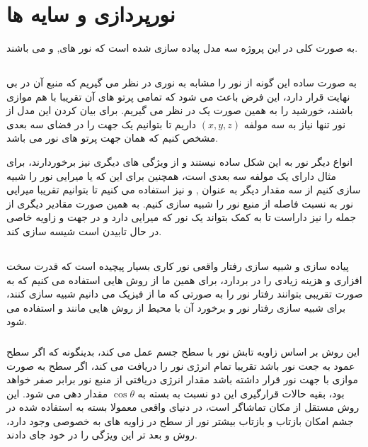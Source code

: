 \documentclass[a4paper, 12pt]{book}
\begin{document}
\newpage
{}
\section*{\huge{نورپردازی و سایه ها}}
\vspace*{0.6cm}
\noindent
\normalsize

    به صورت کلی در این پروژه سه مدل پیاده سازی شده است که  نور های,  و  می باشند.
\subsection*{}
    به صورت ساده این گونه از نور را مشابه به نوری در نظر می گیریم که منبع آن در بی نهایت قرار دارد، این فرض باعث می شود که تمامی پرتو های آن تقریبا با هم موازی باشند، خورشید را به همین صورت یک  در نظر می گیریم. برای بیان کردن این مدل از نور تنها نیاز به سه مولفه
    $(x, y, z)$
    داریم تا بتوانیم یک جهت را در فضای سه بعدی مشخص کنیم که همان جهت پرتو های نور می باشد.\par
    انواع دیگر نور به این شکل ساده نیستند و از ویژگی های دیگری نیز برخوردارند، برای مثال  دارای یک مولفه سه بعدی  است، همچنین برای این که  یا میرایی نور را شبیه سازی کنیم از سه مقدار دیگر به عنوان ,  و  نیز استفاده می کنیم تا بتوانیم تقریبا میرایی نور به نسبت فاصله از منبع نور را شبیه سازی کنیم. به همین صورت مقادیر دیگری از جمله  را نیز داراست تا به کمک  بتواند یک نور که میرایی دارد و در جهت و زاویه خاصی در حال تابیدن است شیسه سازی کند.

\subsection*{}
    پیاده سازی و شبیه سازی رفتار واقعی نور کاری بسیار پیچیده است که قدرت سخت افزاری و هزینه زیادی را در بردارد، برای همین ما از روش هایی استفاده می کنیم که به صورت تقریبی بتوانند رفتار نور را به صورتی که ما از فیزیک می دانیم شبیه سازی کنند، برای شبیه سازی رفتار نور و برخورد آن با محیط از روش هایی مانند  و  استفاده می شود.

    \subsubsection*{}
        این روش بر اساس زاویه تابش نور با سطح جسم عمل می کند، بدینگونه که اگر سطح عمود به جعت نور باشد تقریبا تمام انرژی نور را دریافت می کند، اگر سطح به صورت موازی با جهت نور قرار داشته باشد مقدار انرژی دریافتی از منبع نور برابر صفر خواهد بود، بقیه حالات قرارگیری این دو نسبت به بسته به
        $\cos \theta$
        مقدار دهی می شود. این روش مستقل از مکان تماشاگر است، در دنیای واقعی معمولا بسته به  استفاده شده در جشم امکان بازتاب و بازتاب بیشتر نور از سطح در زاویه های به خصوصی وجود دارد، روش  و بعد تر  این ویژگی را در خود جای دادند.
\end{document}
